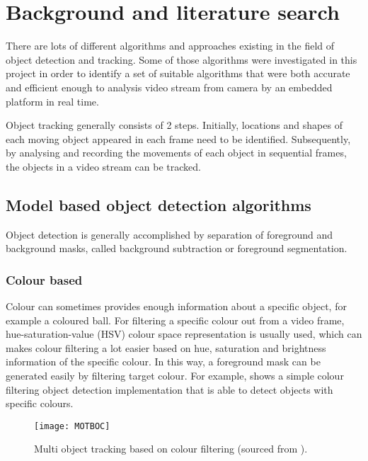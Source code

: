 \chapter{Background and literature search}

There are lots of different algorithms and approaches existing in the field of object detection and tracking. Some of those algorithms were investigated in this project in order to identify a set of suitable algorithms that were both accurate and efficient enough to analysis video stream from camera by an embedded platform in real time.

Object tracking generally consists of 2 steps. Initially, locations and shapes of each moving object appeared in each frame need to be identified. Subsequently, by analysing and recording the movements of each object in sequential frames, the objects in a video stream can be tracked.

\section{Model based object detection algorithms}

\iffalse
Being able to detect objects in a video frame is the first, also the most important and challenging step to do object tracking. This is generally accomplished by separation of foreground objects and background image.
\fi

Object detection is generally accomplished by separation of foreground and background masks, called background subtraction or foreground segmentation.

\subsection{Colour based}
\label{bgs:colour}

Colour can sometimes provides enough information about a specific object, for example a coloured ball. For filtering a specific colour out from a video frame, hue-saturation-value (HSV) colour space \cite[p.~301]{colourspace} representation is usually used, which can makes colour filtering a lot easier based on hue, saturation and brightness information of the specific colour. In this way, a foreground mask can be generated easily by filtering target colour. For example,  shows a simple colour filtering object detection implementation \cite{MOTBOC.git} that is able to detect objects with specific colours.

\begin{figure}[H]
  \centering
  \texttt{[image: MOTBOC]}
  \caption{Multi object tracking based on colour filtering (sourced from \cite{MOTBOC.git}).}
  \label{Figure:MOTBOC}
\end{figure}

